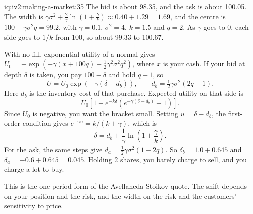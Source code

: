 \begin{solution}{iq:iv2:making-a-market:35}
The bid is about 98.35, and the ask is about 100.05. The width is $\gamma\sigma^2 + \frac{2}{\gamma}\ln\left(1 + \frac{\gamma}{k}\right) \approx 0.40 + 1.29 = 1.69$, and the centre is $100 - \gamma\sigma^2 q = 99.2$, with $\gamma = 0.1$, $\sigma^2 = 4$, $k = 1.5$ and $q = 2$. As $\gamma$ goes to 0, each side goes to $1/k$ from 100, so about 99.33 to 100.67.

With no fill, exponential utility of a normal gives $U_0 = -\exp\left(-\gamma(x + 100q) + \tfrac12\gamma^2\sigma^2 q^2\right)$, where $x$ is your cash. If your bid at depth $\delta$ is taken, you pay $100 - \delta$ and hold $q + 1$, so
\[
U = U_0 \exp\left(-\gamma(\delta - d_b)\right), \qquad d_b = \tfrac12\gamma\sigma^2(2q + 1).
\]
Here $d_b$ is the inventory cost of that purchase. Expected utility on that side is
\[
U_0\left[1 + e^{-k\delta}\left(e^{-\gamma(\delta - d_b)} - 1\right)\right].
\]
Since $U_0$ is negative, you want the bracket small. Setting $u = \delta - d_b$, the first-order condition gives $e^{-\gamma u} = k/(k + \gamma)$, which is
\[
\delta = d_b + \frac{1}{\gamma}\ln\left(1 + \frac{\gamma}{k}\right).
\]
For the ask, the same steps give $d_a = \tfrac12\gamma\sigma^2(1 - 2q)$. So $\delta_b = 1.0 + 0.645$ and $\delta_a = -0.6 + 0.645 = 0.045$. Holding 2 shares, you barely charge to sell, and you charge a lot to buy.

This is the one-period form of the Avellaneda-Stoikov quote. The shift depends on your position and the risk, and the width on the risk and the customers' sensitivity to price.

\end{solution}
